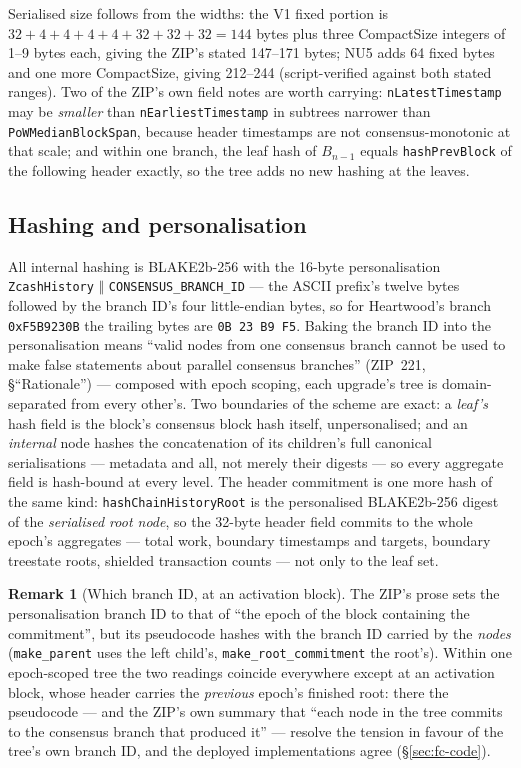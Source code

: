 \documentclass[11pt,a4paper]{article}
\theoremstyle{definition}
\newtheorem{remark}[theorem]{Remark}
\begin{document}
Serialised size follows from the widths: the V1 fixed portion is
$32 + 4 + 4 + 4 + 4 + 32 + 32 + 32 = 144$ bytes plus three CompactSize
integers of 1--9 bytes each, giving the ZIP's stated 147--171 bytes; NU5
adds 64 fixed bytes and one more CompactSize, giving 212--244
(script-verified against both stated ranges). Two of the ZIP's own field
notes are worth carrying: \texttt{nLatestTimestamp} may be
\emph{smaller} than \texttt{nEarliestTimestamp} in subtrees narrower
than \texttt{PoWMedianBlockSpan}, because header timestamps are not
consensus-monotonic at that scale; and within one branch, the leaf hash
of $B_{n-1}$ equals \texttt{hashPrevBlock} of the following header
exactly, so the tree adds no new hashing at the leaves.

\subsection{Hashing and personalisation}\label{sec:fc-hashing}

All internal hashing is BLAKE2b-256 with the 16-byte personalisation
\texttt{ZcashHistory} $\Vert$ \texttt{CONSENSUS\_BRANCH\_ID} --- the
ASCII prefix's twelve bytes followed by the branch ID's four little-endian
bytes, so for Heartwood's branch \texttt{0xF5B9230B} the trailing bytes
are \texttt{0B 23 B9 F5}. Baking the branch ID into the personalisation
means ``valid nodes from one consensus branch cannot be used to make
false statements about parallel consensus branches'' (ZIP~221,
\S``Rationale'') --- composed with epoch scoping, each upgrade's tree is
domain-separated from every other's. Two boundaries of the scheme are
exact: a \emph{leaf's} hash field is the block's consensus block hash
itself, unpersonalised; and an \emph{internal} node hashes the
concatenation of its children's full canonical serialisations ---
metadata and all, not merely their digests --- so every aggregate field
is hash-bound at every level. The header commitment is one more hash of
the same kind: \texttt{hashChainHistoryRoot} is the personalised
BLAKE2b-256 digest of the \emph{serialised root node}, so the 32-byte
header field commits to the whole epoch's aggregates --- total work,
boundary timestamps and targets, boundary treestate roots, shielded
transaction counts --- not only to the leaf set.

\begin{remark}[Which branch ID, at an activation block]
\label{rem:fc-branchid}
The ZIP's prose sets the personalisation branch ID to that of ``the
epoch of the block containing the commitment'', but its pseudocode hashes
with the branch ID carried by the \emph{nodes} (\texttt{make\_parent}
uses the left child's, \texttt{make\_root\_commitment} the root's).
Within one epoch-scoped tree the two readings coincide everywhere except
at an activation block, whose header carries the \emph{previous} epoch's
finished root: there the pseudocode --- and the ZIP's own summary that
``each node in the tree commits to the consensus branch that produced
it'' --- resolve the tension in favour of the tree's own branch ID, and
the deployed implementations agree (\S\ref{sec:fc-code}).
\end{remark}
\end{document}
